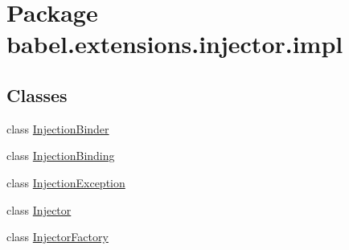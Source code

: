 \hypertarget{namespacebabel_1_1extensions_1_1injector_1_1impl}{\section{Package babel.\-extensions.\-injector.\-impl}
\label{namespacebabel_1_1extensions_1_1injector_1_1impl}
}
\subsection*{Classes}
\begin{DoxyCompactItemize}
\item 
class \hyperlink{classbabel_1_1extensions_1_1injector_1_1impl_1_1_injection_binder}{Injection\-Binder}
\item 
class \hyperlink{classbabel_1_1extensions_1_1injector_1_1impl_1_1_injection_binding}{Injection\-Binding}
\item 
class \hyperlink{classbabel_1_1extensions_1_1injector_1_1impl_1_1_injection_exception}{Injection\-Exception}
\item 
class \hyperlink{classbabel_1_1extensions_1_1injector_1_1impl_1_1_injector}{Injector}
\item 
class \hyperlink{classbabel_1_1extensions_1_1injector_1_1impl_1_1_injector_factory}{Injector\-Factory}
\end{DoxyCompactItemize}

